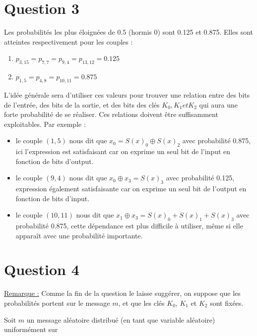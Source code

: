 \section*{Question 3}

Les probabilités les plus éloignées de 0.5 (hormis 0) sont 0.125 et 0.875.
Elles sont atteintes respectivement pour les couples :
\begin{enumerate}
\item $p_{3,15} = p_{7,7} = p_{9,4} = p_{13,12} = 0.125$
\item $p_{1,5} = p_{4,8} = p_{10,11} = 0.875$
\end{enumerate}

L'idée générale sera d'utiliser ces valeurs pour trouver une relation entre des bits de l'entrée, des bits de la sortie, et des bits des clés $K_0, K_1 et K_2$ qui aura une forte probabilité de se réaliser. Ces relations doivent être suffisamment exploitables. Par exemple :
\begin{itemize}
	\item le couple $(1,5)$ nous dit que $x_0 = S(x)_0 \oplus S(x)_2$ avec probabilité 0.875, ici l'expression est satisfaisant car on exprime un seul bit de l'input en fonction de bits d'output.
	\item le couple $(9,4)$ nous dit que $x_0 \oplus x_3 =  S(x)_3$ avec probabilité 0.125, expression également satisfaisante car on exprime un seul bit de l'output en fonction de bits d'input.
	\item le couple $(10,11)$ nous dit que $x_1 \oplus x_3 = S(x)_0 + S(x)_1 + S(x)_3$ avec probabilité 0.875, cette dépendance est plus difficile à utiliser, même si elle apparaît avec une probabilité importante.
\end{itemize}


\section*{Question 4}

\underline{Remarque :} Comme la fin de la question le laisse suggérer, on suppose que les probabilités portent sur le message $m$, et que les clés $K_0$, $K_1$ et $K_2$ sont fixées.

Soit $m$ un message aléatoire distribué (en tant que variable aléatoire) uniformément sur %

